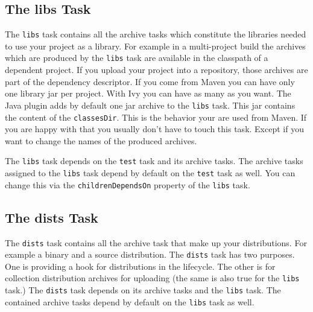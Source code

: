 \subsection{The libs Task} %
\label{sub:the_libs_task}
The \texttt{libs} task contains all the archive tasks which constitute the libraries needed to use your project as a library. For example in a multi-project build the archives which are produced by the \texttt{libs} task are available in the classpath of a dependent project. If you upload your project into a repository, those archives are part of the dependency descriptor. If you come from Maven you can have only one library jar per project. With Ivy you can have as many as you want. 
The Java plugin adds by default one jar archive to the \texttt{libs} task. This jar contains the content of the \texttt{classesDir}. This is the behavior your are used from Maven. If you are happy with that you usually don't have to touch this task. Except if you want to change the names of the produced archives. 

The \texttt{libs} task depends on the \texttt{test} task and its archive tasks. The archive tasks assigned to the \texttt{libs} task depend by default on the \texttt{test} task as well. You can change this via the \texttt{childrenDependsOn} property of the \texttt{libs} task. 
\subsection{The dists Task} %
\label{sub:the_dists_task}
The \texttt{dists} task contains all the archive task that make up your distributions. For example a binary and a source distribution. The \texttt{dists} task has two purposes. One is providing a hook for distributions in the lifecycle. The other is for collection distribution archives for uploading (the same is also true for the \texttt{libs} task.) The \texttt{dists} task depends on its archive tasks and the \texttt{libs} task. The contained archive tasks depend by default on the \texttt{libs} task as well.
